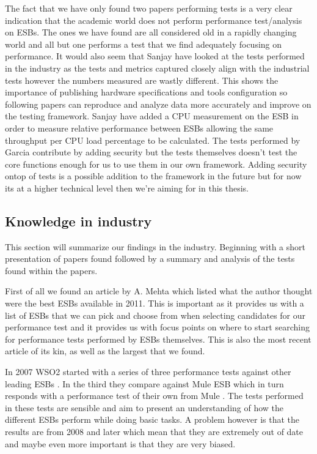 The fact that we have only found two papers \cite{Sanjay2011,Garcia2010} performing tests is a very clear indication that the academic world does not perform performance test/analysis on ESBs. The ones we have found are all considered old in a rapidly changing world and all but one \cite{Sanjay2011} performs a test that we find adequately focusing on performance. 
It would also seem that Sanjay \cite{Sanjay2011} have looked at the tests performed in the industry \cite{Perera07,Perera07R2,Perera07R3,mulesoft08} as the tests and metrics captured closely align with the industrial tests however the numbers measured are wastly different. 
This shows the importance of publishing hardware specifications and tools configuration so following papers can reproduce and analyze data more accurately and improve on the testing framework.
Sanjay have added a CPU measurement on the ESB in order to measure relative performance between ESBs allowing the same throughput per CPU load percentage to be calculated.
The tests performed by Garcia \cite{Garcia2010} contribute by adding security but the tests themselves doesn't test the core functions enough for us to use them in our own framework. 
Adding security ontop of tests is a possible addition to the framework in the future but for now its at a higher technical level then we're aiming for in this thesis.


\subsection{Knowledge in industry}
\label{sec:industry_section}
This section will summarize our findings in the industry. Beginning with a short presentation of papers found followed by a summary and analysis of the tests found within the papers.


First of all we found an article by A. Mehta \cite{mehta11} which listed what the author thought were the best ESBs available in 2011. This is important as it provides us with a list of ESBs that we can pick and choose from when selecting candidates for our performance test and it provides us with focus points on where to start searching for performance tests performed by ESBs themselves. This is also the most recent article of its kin, as well as the largest that we found.


In 2007 WSO2 started with a series of three performance tests against other leading ESBs \cite{Perera07,Perera07R2,Perera07R3}. In the third they compare against Mule ESB which in turn responds with a performance test of their own from Mule \cite{mulesoft08}. The tests performed in these tests are sensible and aim to present an understanding of how the different ESBs perform while doing basic tasks. A problem however is that the results are from 2008 and later which mean that they are extremely out of date and maybe even more important is that they are very biased.



